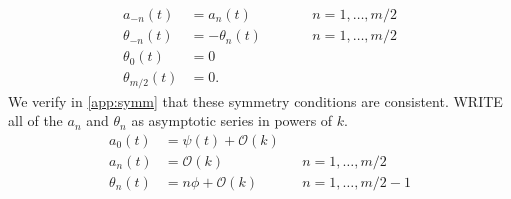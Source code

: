 \documentclass[11pt,reqno]{amsart}
\begin{document}
\begin{equation}\label{eq:symm}
\begin{aligned}
a_{-n}(t) &= a_{n}(t) && \qquad n = 1, \dots, m/2 \\
\theta_{-n}(t) &= -\theta_{n}(t) && \qquad n = 1, \dots, m/2 \\
\theta_0(t) &= 0 \\
\theta_{m/2}(t) &= 0.
\end{aligned}
\end{equation}
We verify in \cref{app:symm} that these symmetry conditions are consistent. WRITE all of the $a_n$ and $\theta_n$ as asymptotic series in powers of $k$. 
\begin{equation}\label{eq:basicseries}
\begin{aligned}
a_0(t) &= \psi(t) + \mathcal{O}(k) \\
a_n(t) &= \mathcal{O}(k) && n = 1, \dots, m/2 \\
\theta_n(t) &= n \phi + \mathcal{O}(k) && n = 1, \dots, m/2-1
\end{aligned}
\end{equation}
\end{document}
